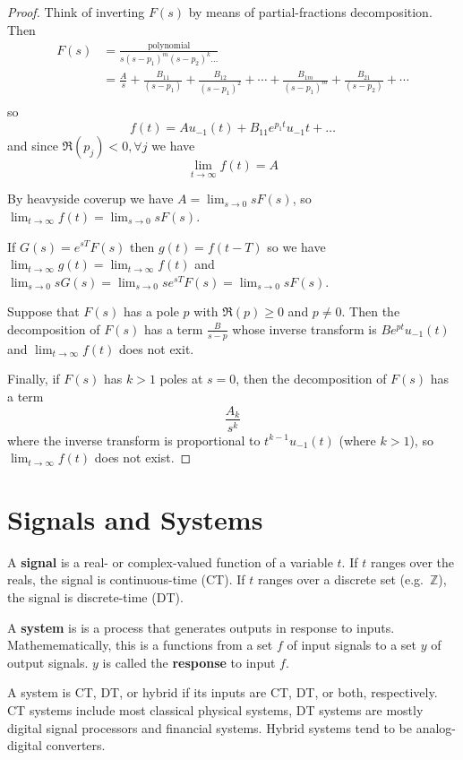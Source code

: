 \documentclass[12pt]{article}
\begin{document}
\begin{proof}
Think of inverting $F(s)$ by means of partial-fractions decomposition. Then
\begin{align*}
F(s) &= \frac{\text{polynomial}}{s{(s-p_1)}^m{(s-p_2)}^k\dots}\\
&= \frac{A}{s} + \frac{B_{11}}{(s-p_1)} + \frac{B_{12}}{{(s-p_1)}^2} + \cdots + \frac{B_{1m}}{{(s-p_1)}^m} + \frac{B_{21}}{(s-p_2)} + \cdots\\
\end{align*}
so \[ f(t) = Au_{-1}(t) + B_{11}e^{p_1 t} u_{-1}t + \dots \] and since $\Re(p_j) < 0, \forall j$ we have \[ \lim_{t\to\infty} f(t) = A \]

By heavyside coverup we have $A = \lim_{s\to 0} sF(s)$, so $\lim_{t\to\infty} f(t) = \lim_{s\to 0} sF(s)$.

If $G(s) = e^{sT}F(s)$ then $g(t) = f(t-T)$ so we have $\lim_{t\to\infty} g(t) = \lim_{t\to\infty} f(t)$ and $\lim_{s\to 0} sG(s) = \lim_{s\to 0} se^{sT} F(s) = \lim_{s\to 0} sF(s)$.

Suppose that $F(s)$ has a pole $p$ with $\Re(p) \geq 0$ and $p \neq 0$. Then the decomposition of $F(s)$ has a term $\frac{B}{s-p}$ whose inverse transform is $Be^{pt} u_{-1}(t)$ and $\lim_{t\to\infty} f(t)$ does not exit.

Finally, if $F(s)$ has $k > 1$ poles at $s = 0$, then the decomposition of $F(s)$ has a term \[ \frac{A_k}{s^k} \] where the inverse transform is proportional to $t^{k-1} u_{-1}(t)$ (where $k > 1$), so $\lim_{t\to\infty} f(t)$ does not exist.
\end{proof}

\section{Signals and Systems}
A {\bf signal} is a real- or complex-valued function of a variable $t$. If $t$ ranges over the reals, the signal is continuous-time (CT). If $t$ ranges over a discrete set (e.g.\ $\mathbb{Z}$), the signal is discrete-time (DT).

A {\bf system} is is a process that generates outputs in response to inputs. Mathemematically, this is a functions from a set $f$ of input signals to a set $y$ of output signals. $y$ is called the {\bf response} to input $f$.

A system is CT, DT, or hybrid if its inputs are CT, DT, or both, respectively. CT systems include most classical physical systems, DT systems are mostly digital signal processors and financial systems. Hybrid systems tend to be analog-digital converters.
\end{document}
